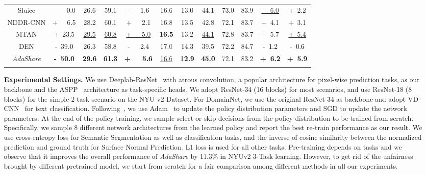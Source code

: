 \begin{table}
\begin{center}
{\begin{tabular}{c|c|ccc|cccccc|c}
            Sluice & \cellcolor{lightgray!15} \ \ \ \ 0.0 & 26.6 & 59.1 &\cellcolor{lightgray!15} -\ \ \ 1.6 & 16.6 & 13.0 & 44.1 & 73.0 & 83.9 &\cellcolor{lightgray!15}  \underline{+\ 6.0} &\cellcolor{lightgray!15}  +\ 2.2\\
            NDDR-CNN & \cellcolor{lightgray!15} + \ \ 6.5 & 28.2	& 60.1&\cellcolor{lightgray!15} +\ \ \ 2.1 & 16.8 & 13.5 & 42.8 & 72.1 
            & 83.7 & \cellcolor{lightgray!15} +\ 4.1 & \cellcolor{lightgray!15} +\ 3.1 \\
            MTAN &\cellcolor{lightgray!15} +\ 23.5 & \underline{29.5}	& \underline{60.8} &\cellcolor{lightgray!15}  \underline{+\ \ \ 5.0} &  \textbf{16.5} & 13.2 & \underline{44.1} & 72.8 & 83.7 & \cellcolor{lightgray!15} +\ 5.7 &\cellcolor{lightgray!15}  \underline{+\ 5.4} \\
            DEN & \cellcolor{lightgray!15} -\ 39.0 & 26.3 & 58.8 & \cellcolor{lightgray!15} -\ \ \  2.4 & 17.0 & 14.3 & 39.5 & 72.2 & 84.7 &\cellcolor{lightgray!15}  -\ 1.2 &\cellcolor{lightgray!15}  -\ 0.6 \\
            \hline
            \textit{AdaShare} &\cellcolor{lightgray!15} \textbf{-\ 50.0} & \textbf{29.6} & \textbf{61.3} & \cellcolor{lightgray!15} \textbf{+\ \ \ 5.6}& \underline{16.6} & \textbf{12.9} & \textbf{45.0} & 72.1 & 83.2 & \cellcolor{lightgray!15} \textbf{+\ 6.2} &\cellcolor{lightgray!15}  \textbf{+\ 5.9} \\
            \Xhline{3\arrayrulewidth} 
        \end{tabular}
        }
        \vspace{-3mm}
    \end{center}
\end{table} 
\noindent\textbf{Experimental Settings.} We use Deeplab-ResNet~\cite{chen2017deeplab} with atrous convolution, a popular architecture for pixel-wise prediction tasks, as our backbone and the ASPP~\cite{chen2017deeplab} architecture as task-specific heads. 
We adopt ResNet-34 (16 blocks) for most scenarios, and use ResNet-18 (8 blocks) for the simple 2-task scenario on the NYU v2 Dataset. For DomainNet, we use the original ResNet-34 as backbone and adopt VD-CNN~\cite{conneau2016very} for text classification.
Following~\cite{wu2019fbnet}, we use Adam~\cite{kingma2014adam} to update the policy distribution parameters and SGD to update the network parameters.
At the end of the policy training, we sample select-or-skip decisions from the policy distribution to be trained from scratch. 
Specifically, we sample 8 different network architectures from the learned policy and report the best re-train performance as our result. 
We use cross-entropy loss for Semantic Segmentation as well as classification tasks, and the inverse of cosine similarity between the normalized prediction and ground truth for Surface Normal Prediction. L1 loss is used for all other tasks. Pre-training depends on tasks and we observe that it improves the overall performance of \textit{AdaShare} by 11.3\% in NYUv2 3-Task learning. However, to get rid of the unfairness brought by different pretrained model, we start from scratch for a fair comparison among different methods in all our experiments. 

